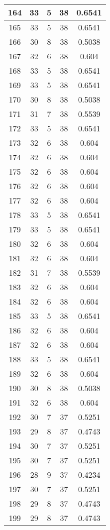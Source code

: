 \documentclass[letterpaper, 12pt]{article}
\begin{document}
\begin{longtable}{|c|c|c|c|c|}
164 & 33 & 5 & 38 & 0.6541 \\
\hline
165 & 33 & 5 & 38 & 0.6541 \\
\hline
166 & 30 & 8 & 38 & 0.5038 \\
\hline
167 & 32 & 6 & 38 & 0.604 \\
\hline
168 & 33 & 5 & 38 & 0.6541 \\
\hline
169 & 33 & 5 & 38 & 0.6541 \\
\hline
170 & 30 & 8 & 38 & 0.5038 \\
\hline
171 & 31 & 7 & 38 & 0.5539 \\
\hline
172 & 33 & 5 & 38 & 0.6541 \\
\hline
173 & 32 & 6 & 38 & 0.604 \\
\hline
174 & 32 & 6 & 38 & 0.604 \\
\hline
175 & 32 & 6 & 38 & 0.604 \\
\hline
176 & 32 & 6 & 38 & 0.604 \\
\hline
177 & 32 & 6 & 38 & 0.604 \\
\hline
178 & 33 & 5 & 38 & 0.6541 \\
\hline
179 & 33 & 5 & 38 & 0.6541 \\
\hline
180 & 32 & 6 & 38 & 0.604 \\
\hline
181 & 32 & 6 & 38 & 0.604 \\
\hline
182 & 31 & 7 & 38 & 0.5539 \\
\hline
183 & 32 & 6 & 38 & 0.604 \\
\hline
184 & 32 & 6 & 38 & 0.604 \\
\hline
185 & 33 & 5 & 38 & 0.6541 \\
\hline
186 & 32 & 6 & 38 & 0.604 \\
\hline
187 & 32 & 6 & 38 & 0.604 \\
\hline
188 & 33 & 5 & 38 & 0.6541 \\
\hline
189 & 32 & 6 & 38 & 0.604 \\
\hline
190 & 30 & 8 & 38 & 0.5038 \\
\hline
191 & 32 & 6 & 38 & 0.604 \\
\hline
192 & 30 & 7 & 37 & 0.5251 \\
\hline
193 & 29 & 8 & 37 & 0.4743 \\
\hline
194 & 30 & 7 & 37 & 0.5251 \\
\hline
195 & 30 & 7 & 37 & 0.5251 \\
\hline
196 & 28 & 9 & 37 & 0.4234 \\
\hline
197 & 30 & 7 & 37 & 0.5251 \\
\hline
198 & 29 & 8 & 37 & 0.4743 \\
\hline
199 & 29 & 8 & 37 & 0.4743 \\
\hline
\end{longtable}
\end{document}
